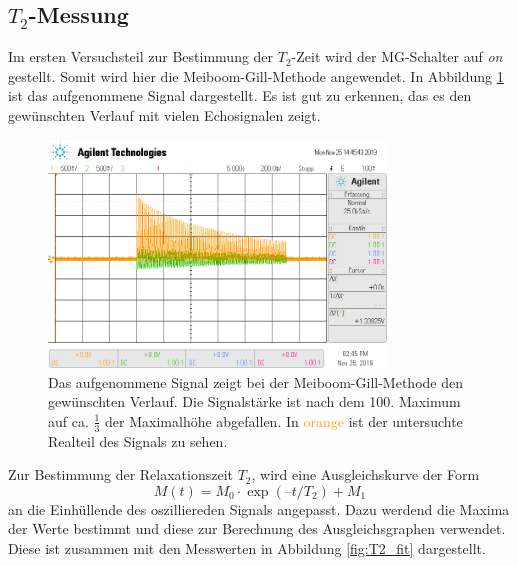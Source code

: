 \subsection{$T_2$-Messung}
Im ersten Versuchsteil zur Bestimmung der $T_2$-Zeit wird der MG-Schalter auf \textit{on} gestellt. Somit
wird hier die Meiboom-Gill-Methode angewendet.
In Abbildung \ref{fig:t2} ist das aufgenommene Signal dargestellt. Es ist gut zu erkennen, das es den gewünschten Verlauf mit vielen Echosignalen zeigt.
\begin{figure}[H]
  \centering
  \includegraphics[width=0.8\textwidth]{../data/T2.png}
  \caption{Das aufgenommene Signal zeigt bei der Meiboom-Gill-Methode den gewünschten Verlauf. Die Signalstärke ist nach dem
  100. Maximum auf ca. $\frac{1}{3}$ der Maximalhöhe abgefallen. In \textcolor{orange}{orange} ist der untersuchte
  Realteil des Signals zu sehen.}
  \label{fig:t2}
\end{figure} \noindent
Zur Bestimmung der Relaxationszeit $T_2$, wird eine Ausgleichskurve der Form
\begin{equation*}
  M(t) = M_0 \cdot \exp(–t/T_2) + M_1
\end{equation*}
an die Einhüllende des oszilliereden Signals angepasst.
Dazu werdend die Maxima der Werte bestimmt und diese zur Berechnung des Ausgleichsgraphen verwendet.
Diese ist zusammen mit den Messwerten in Abbildung \ref{fig:T2_fit}
dargestellt.
